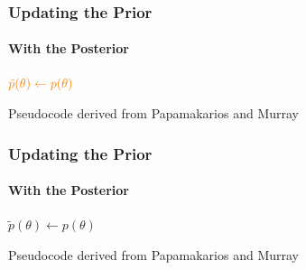 \documentclass[9pt, aspectratio=169]{beamer}
\begin{document}
\begin{frame}
\frametitle{Updating the Prior}
\framesubtitle{With the Posterior}
\begin{algorithm}[H]
	$\color{orange}\tilde{p}(\theta) \leftarrow p(\theta)$\\
\end{algorithm}
\vspace{35pt}
\tiny Pseudocode derived from Papamakarios and Murray \cite{papamakarios2016fast}
\end{frame} 
\begin{frame}
\frametitle{Updating the Prior}
\framesubtitle{With the Posterior}
\begin{algorithm}[H]
	$\tilde{p}(\theta) \leftarrow p(\theta)$\\
\end{algorithm}
\vspace{35pt}
\tiny Pseudocode derived from Papamakarios and Murray \cite{papamakarios2016fast}
\end{frame} 
\end{document}
